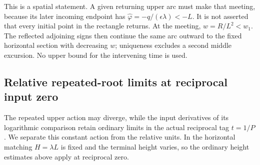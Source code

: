 This is a spatial statement. A given returning upper arc must make
that meeting, because its later incoming endpoint has
$\hat\varphi=-q/(\epsilon\lambda)<-L$. It is not asserted that
every initial point in the rectangle returns. At the meeting,
$w=R/L^2<w_1$. The reflected adjoining signs then continue the
same arc outward to the fixed horizontal section with decreasing
$w$; uniqueness excludes a second middle excursion. No upper bound
for the intervening time is used.

\subsection{Relative repeated-root limits at reciprocal input zero}
\label{rw:app:secondary-tails}

The repeated upper action may diverge, while the input derivatives of
its logarithmic comparison retain ordinary limits in the actual
reciprocal tag $t=1/P$. We separate this constant action from the
relative units. In the horizontal matching $H=\lambda L$ is fixed
and the terminal height varies, so the ordinary height estimates above
apply at reciprocal zero.

